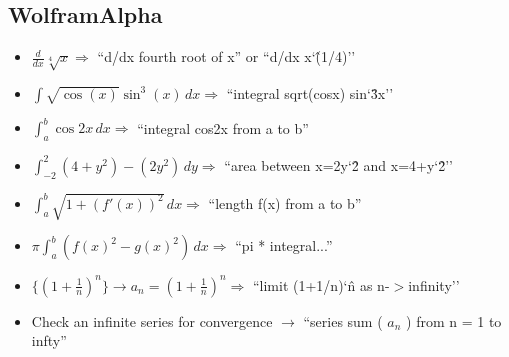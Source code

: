 \documentclass[8pt,letterpaper]{article}
\begin{document}
\subsection*{WolframAlpha}
\begin{itemize}
\item $\frac{d}{dx} \sqrt[4]{x} \Rightarrow$ ``d/dx fourth root of x'' or ``d/dx x\char`\^(1/4)''
\item $\int \sqrt{\cos(x)} \sin^3(x)\,dx \Rightarrow$ ``integral sqrt(cosx) sin\char`\^3x''
\item $\int_a^b \cos2x \, dx \Rightarrow$ ``integral cos2x from a to b''
\item $\int_{-2}^2 (4+y^2) - (2y^2) \, dy \Rightarrow$ ``area between x=2y\char`\^2 and x=4+y\char`\^2''
\item $\int_a^b \sqrt{1 + (f'(x))^2}\,dx \Rightarrow$ ``length f(x) from a to b''
\item $\pi \int_a^b \left(f(x)^2 - g(x)^2\right)\,dx \Rightarrow$ ``pi * integral...''
\item $\{(1+\frac{1}{n})^n\} \rightarrow a_n = (1+\frac{1}{n})^n \Rightarrow$ ``limit (1+1/n)\char`\^n as n-$>$infinity''
\item Check an infinite series for convergence $\rightarrow$ ``series  sum ( $a_n$ ) from n = 1 to infty''
\end{itemize}
\end{document}
